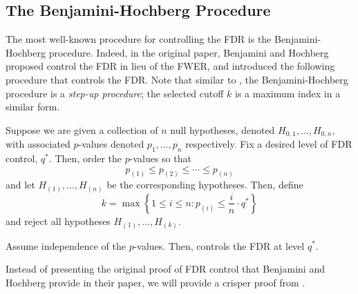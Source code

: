 \subsection{The Benjamini-Hochberg Procedure}
The most well-known procedure for controlling the FDR is the Benjamini-Hochberg procedure. Indeed, in the original paper, Benjamini and Hochberg proposed control the FDR in lieu of the FWER, and introduced the following procedure that controls the FDR. Note that similar to , the Benjamini-Hochberg procedure is a \emph{step-up procedure}; the selected cutoff $k$ is a maximum index in a similar form. 
\begin{proc}
\label{bhproc}
Suppose we are given a collection of $n$ null hypotheses, denoted $H_{0, 1}, \ldots, H_{0, n}$, with associated $p$-values denoted $p_1, \ldots, p_n$ respectively. Fix a desired level of FDR control, $q^*$. Then, order the $p$-values so that
\[ p_{(1)} \leq p_{(2)} \leq \cdots \leq p_{(n)} \] and let $H_{(1)}, \ldots, H_{(n)}$ be the corresponding hypotheses. Then, define
\[ k = \max \left\{ 1 \leq i \leq n : p_{(i)} \leq \frac{i}{n} \cdot q^* \right \}  \] 
and reject all hypotheses $H_{(1)}, \ldots, H_{(k)}$.  
\end{proc}
\begin{prop}
Assume independence of the $p$-values. Then,  controls the FDR at level $q^*$.
\end{prop}
Instead of presenting the original proof of FDR control that Benjamini and Hochberg provide in their paper, we will provide a crisper proof from \cite{stat300}.

